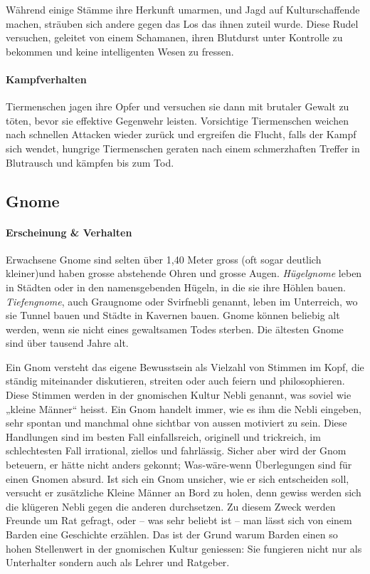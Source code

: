 \documentclass[10pt,twoside,twocolumn,openany]{book}
\begin{document}
Während einige Stämme ihre Herkunft umarmen, und Jagd auf Kulturschaffende machen, sträuben sich andere gegen das Los das ihnen zuteil wurde. Diese Rudel versuchen, geleitet von einem Schamanen, ihren Blutdurst unter Kontrolle zu bekommen und keine intelligenten Wesen zu fressen.

\paragraph{Kampfverhalten}
Tiermenschen jagen ihre Opfer und versuchen sie dann mit brutaler Gewalt zu töten, bevor sie effektive Gegenwehr leisten. Vorsichtige Tiermenschen weichen nach schnellen Attacken wieder zurück und ergreifen die Flucht, falls der Kampf sich wendet, hungrige Tiermenschen geraten nach einem schmerzhaften Treffer in Blutrausch und kämpfen bis zum Tod.

\subsection{Gnome}

\paragraph{Erscheinung \& Verhalten}	
Erwachsene Gnome sind selten über 1,40 Meter gross (oft sogar deutlich kleiner)und haben grosse abstehende Ohren und grosse Augen. \emph{Hügelgnome} leben in Städten oder in den namensgebenden Hügeln, in die sie ihre Höhlen bauen. \emph{Tiefengnome}, auch Graugnome oder Svirfnebli genannt, leben im Unterreich, wo sie Tunnel bauen und Städte in Kavernen bauen. Gnome können beliebig alt werden, wenn sie nicht eines gewaltsamen Todes sterben. Die ältesten Gnome sind über tausend Jahre alt.

Ein Gnom versteht das eigene Bewusstsein als Vielzahl von Stimmen im Kopf, die ständig miteinander diskutieren, streiten oder auch feiern und philosophieren. Diese Stimmen werden in der gnomischen Kultur Nebli genannt, was soviel wie „kleine Männer“ heisst.
Ein Gnom handelt immer, wie es ihm die Nebli eingeben, sehr spontan und manchmal ohne sichtbar von aussen motiviert zu sein. Diese Handlungen sind im besten Fall einfallsreich, originell und trickreich, im schlechtesten Fall irrational, ziellos und fahrlässig. Sicher aber wird der Gnom beteuern, er hätte nicht anders gekonnt; Was-wäre-wenn Überlegungen sind für einen Gnomen absurd. Ist sich ein Gnom unsicher, wie er sich entscheiden soll, versucht er zusätzliche Kleine Männer an Bord zu holen, denn gewiss werden sich die klügeren Nebli gegen die anderen durchsetzen.  Zu diesem Zweck werden Freunde um Rat gefragt, oder – was sehr beliebt ist – man lässt sich von einem Barden eine Geschichte erzählen. Das ist der Grund warum Barden einen so hohen Stellenwert in der gnomischen Kultur geniessen: Sie fungieren nicht nur als Unterhalter sondern auch als Lehrer und Ratgeber.
\end{document}
